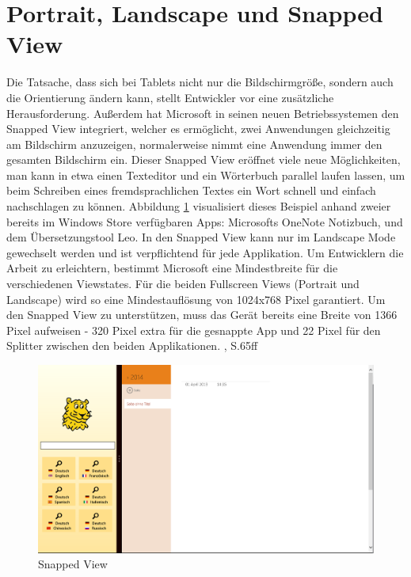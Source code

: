 \documentclass[a4paper,bibtotoc,oneside]{scrbook}
\begin{document}
\section[Portrait und Landscape]{Portrait, Landscape und Snapped View}
Die Tatsache, dass sich bei Tablets nicht nur die Bildschirmgröße, sondern auch die Orientierung ändern kann, stellt Entwickler vor eine zusätzliche Herausforderung. Außerdem hat Microsoft in seinen neuen Betriebssystemen den Snapped View integriert, welcher es ermöglicht, zwei Anwendungen gleichzeitig am Bildschirm anzuzeigen, normalerweise nimmt eine Anwendung immer den gesamten Bildschirm ein. Dieser Snapped View eröffnet viele neue Möglichkeiten, man kann in etwa einen Texteditor und ein Wörterbuch parallel laufen lassen, um beim Schreiben eines fremdsprachlichen Textes ein Wort schnell und einfach nachschlagen zu können. 
\newline
Abbildung \ref{Abb4} visualisiert dieses Beispiel anhand zweier bereits im Windows Store verfügbaren Apps: Microsofts OneNote Notizbuch, und dem Übersetzungstool Leo. In den Snapped View kann nur im Landscape Mode gewechselt werden und ist verpflichtend für jede Applikation.
\newline
\newline
Um Entwicklern die Arbeit zu erleichtern, bestimmt Microsoft eine Mindestbreite für die verschiedenen Viewstates. Für die beiden Fullscreen Views (Portrait und Landscape) wird so eine Mindestauflösung von 1024x768 Pixel garantiert. Um den Snapped View zu unterstützen, muss das Gerät bereits eine Breite von 1366 Pixel aufweisen - 320 Pixel extra für die gesnappte App und 22 Pixel für den Splitter zwischen den beiden Applikationen. \cite{ana12}, S.65ff
\begin{figure}[htbp]
\centering
\includegraphics[scale=0.4]{images/snapped.png}
\caption[Snapped View]{Snapped View}\label{Abb4}
\end{figure}
\end{document}

